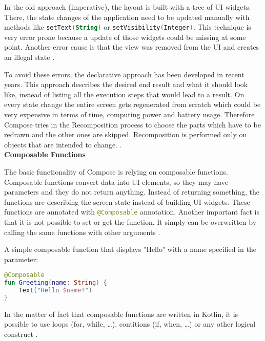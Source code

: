 In the old approach (imperative), the layout is built with a tree of UI widgets. There, the state changes of the application need to be updated manually with methods like \lstinline[language=Kotlin]{setText(String)} or \lstinline[language=Kotlin]{setVisibility(Integer)}. This technique is very error prone because a update of those widgets could be missing at some point. Another error cause is that the view was removed from the UI and creates an illegal state \cite{android_thinking_in_compose}.

To avoid these errors, the declarative approach has been developed in recent years. This approach describes the desired end result and what it should look like, instead of listing all the execution steps that would lead to a result. On every state change the entire screen gets regenerated from scratch which could be very expensive in terms of time, computing power and battery usage. Therefore Compose tries in the Recomposition process to choose the parts which have to be redrawn and the other ones are skipped. Recomposition is performed only on objects that are intended to change. \cite{android_thinking_in_compose}. \\

\noindent
\textbf{Composable Functions}

The basic functionality of Compose is relying on composable functions. Composable functions convert data into UI elements, so they may have parameters and they do not return anything. Instead of returning something, the functions are describing the screen state instead of building UI widgets. These functions are annotated with \lstinline[language=Kotlin]{@Composable} annotation. Another important fact is that it is not possible to set or get the function. It simply can be overwritten by calling the same functions with other arguments \cite{android_thinking_in_compose}.

A simple composable function that displays "Hello" with a name specified in the parameter:

\begin{lstlisting}[language=Kotlin]
@Composable
fun Greeting(name: String) {
    Text("Hello $name!")
}
\end{lstlisting}

In the matter of fact that composable functions are written in Kotlin, it is possible to use loops (for, while, \ldots), contitions (if, when, \ldots) or any other logical construct \cite{android_thinking_in_compose}. \\

